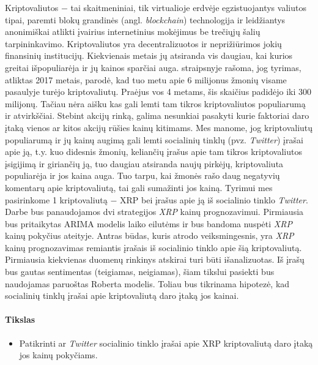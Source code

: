 \documentclass[12pt,a4paper]{article}
\begin{document}
Kriptovaliutos $-$ tai skaitmeniniai, tik virtualioje erdvėje egzistuojantys valiutos tipai, paremti blokų grandinės (angl. \emph{blockchain}) technologija ir leidžiantys anonimiškai atlikti įvairius internetinius mokėjimus be trečiųjų šalių tarpininkavimo. Kriptovaliutos yra decentralizuotos ir neprižiūrimos jokių finansinių institucijų. Kiekvienais metais jų atsiranda vis daugiau, kai kurios greitai išpopuliarėja ir jų kainos sparčiai auga. \cite{akbiyik2021erkul} straipsnyje rašoma, jog tyrimas, atliktas 2017 metais, parodė, kad tuo metu apie 6 milijonus žmonių visame pasaulyje turėjo kriptovaliutų. Praėjus vos 4 metams, šis skaičius padidėjo iki 300 milijonų. Tačiau nėra aišku kas gali lemti tam tikros kriptovaliutos populiarumą ir atvirkščiai. Stebint akcijų rinką, galima nesunkiai pasakyti kurie faktoriai daro įtaką vienos ar kitos akcijų rūšies kainų kitimams. Mes manome, jog kriptovaliutų populiarumą ir jų kainų augimą gali lemti socialinių tinklų (pvz. \emph{Twitter}) įrašai apie ją, t.y. kuo didesnis žmonių, keliančių įrašus apie tam tikros kriptovaliutos įsigijimą ir giriančių ją, tuo daugiau atsiranda naujų pirkėjų, kriptovaliuta populiarėja ir jos kaina auga. Tuo tarpu, kai žmonės rašo daug negatyvių komentarų apie kriptovaliutą, tai gali sumažinti jos kainą. 
\newline{}Tyrimui mes pasirinkome 1 kriptovaliutą $-$ XRP bei įrašus apie ją iš socialinio tinklo \emph{Twitter}.
\newline{}Darbe bus panaudojamos dvi strategijos \emph{XRP} kainų prognozavimui. Pirmiausia bus pritaikytas ARIMA modelis laiko eilutėms ir bus bandoma nuspėti \emph{XRP} kainų pokyčius ateityje. Antras būdas, kuris atrodo veiksmingesnis, yra \emph{XRP} kainų prognozavimas remiantis įrašais iš socialinio tinklo  apie šią kriptovaliutą. Pirmiausia kiekvienas duomenų rinkinys atskirai turi būti išanalizuotas. Iš įrašų bus gautas sentimentas (teigiamas, neigiamas), šiam tikslui pasiekti bus naudojamas paruoštas Roberta modelis. Toliau bus tikrinama hipotezė, kad socialinių tinklų įrašai apie kriptovaliutą daro įtaką jos kainai. 
 

\paragraph{Tikslas}
\begin{itemize}
    \item Patikrinti ar \emph{Twitter} socialinio tinklo įrašai apie XRP kriptovaliutą daro įtaką jos kainų pokyčiams.
\end{itemize}
\end{document}

